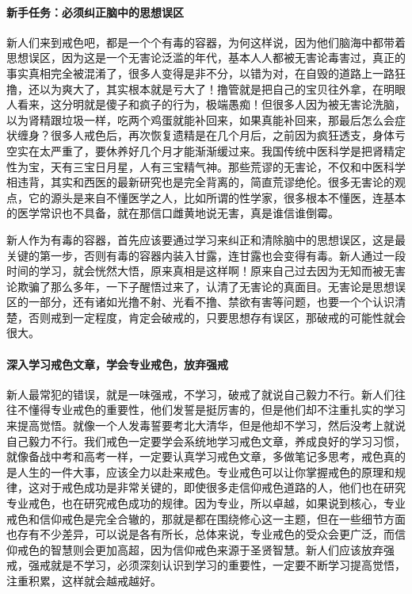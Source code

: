 \paragraph{新手任务：必须纠正脑中的思想误区}

新人们来到戒色吧，都是一个个有毒的容器，为何这样说，因为他们脑海中都带着思想误区，因为这是一个无害论泛滥的年代，基本人人都被无害论毒害过，真正的事实真相完全被混淆了，很多人变得是非不分，以错为对，在自毁的道路上一路狂撸，还以为爽大了，其实根本就是亏大了！撸管就是把自己的宝贝往外拿，在明眼人看来，这分明就是傻子和疯子的行为，极端愚痴！但很多人因为被无害论洗脑，以为肾精跟垃圾一样，吃两个鸡蛋就能补回来，如果真能补回来，那最后怎么会症状缠身？很多人戒色后，再次恢复遗精是在几个月后，之前因为疯狂透支，身体亏空实在太严重了，要休养好几个月才能渐渐缓过来。我国传统中医科学是把肾精定性为宝，天有三宝日月星，人有三宝精气神。那些荒谬的无害论，不仅和中医科学相违背，其实和西医的最新研究也是完全背离的，简直荒谬绝伦。很多无害论的观点，它的源头是来自不懂医学之人，比如所谓的性学家，很多根本不懂医，连基本的医学常识也不具备，就在那信口雌黄地说无害，真是谁信谁倒霉。

新人作为有毒的容器，首先应该要通过学习来纠正和清除脑中的思想误区，这是最关键的第一步，否则有毒的容器内装入甘露，连甘露也会变得有毒。新人通过一段时间的学习，就会恍然大悟，原来真相是这样啊！原来自己过去因为无知而被无害论欺骗了那么多年，一下子醒悟过来了，认清了无害论的真面目。无害论是思想误区的一部分，还有诸如光撸不射、光看不撸、禁欲有害等问题，也要一个个认识清楚，否则戒到一定程度，肯定会破戒的，只要思想存有误区，那破戒的可能性就会很大。

\paragraph{深入学习戒色文章，学会专业戒色，放弃强戒}

新人最常犯的错误，就是一味强戒，不学习，破戒了就说自己毅力不行。新人们往往不懂得专业戒色的重要性，他们发誓是挺厉害的，但是他们却不注重扎实的学习来提高觉悟。就像一个人发毒誓要考北大清华，但是他却不学习，然后没考上就说自己毅力不行。我们戒色一定要学会系统地学习戒色文章，养成良好的学习习惯，就像备战中考和高考一样，一定要认真学习戒色文章，多做笔记多思考，戒色真的是人生的一件大事，应该全力以赴来戒色。专业戒色可以让你掌握戒色的原理和规律，这对于戒色成功是非常关键的，即使很多走信仰戒色道路的人，他们也在研究专业戒色，也在研究戒色成功的规律。因为专业，所以卓越，如果说到核心，专业戒色和信仰戒色是完全合辙的，那就是都在围绕修心这一主题，但在一些细节方面也存有不少差异，可以说是各有所长，总体来说，专业戒色的受众会更广泛，而信仰戒色的智慧则会更加高超，因为信仰戒色来源于圣贤智慧。新人们应该放弃强戒，强戒就是不学习，必须深刻认识到学习的重要性，一定要不断学习提高觉悟，注重积累，这样就会越戒越好。

